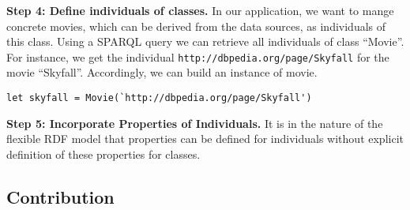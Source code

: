 \documentclass{llncs} %
\begin{document}
\vspace{0.8em}
\noindent
\textbf{Step 4: Define individuals of classes.}
In our application, we want to mange concrete movies, which can be derived from the data sources,
as individuals of this class. Using a SPARQL query we can retrieve all individuals of class ``Movie''.
For instance, we get the individual \texttt{http://dbpedia.org/page/Skyfall} for the movie ``Skyfall''.
Accordingly, we can build an instance of movie.

\begin{lstlisting}[style=code, caption={Individual of  ``Movie'' }, label={lst:skyfall}]
  let skyfall = Movie(`http://dbpedia.org/page/Skyfall')
\end{lstlisting}


\vspace{0.8em}
\noindent
\textbf{Step 5: Incorporate Properties of Individuals.}
It is in the nature of the flexible RDF model that properties can be defined for individuals 
without explicit definition of these properties for classes.







\subsection{Contribution}
\end{document}
